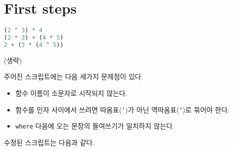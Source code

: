 \chapter{\Large{First steps}}


\begin{lstlisting}[language=Haskell,escapeinside=~~]
(2 ^ 3) * 4
(2 * 3) + (4 * 5)
2 + (3 * (4 ^ 5))
\end{lstlisting}


(생략)


주어진 스크립트에는 다음 세가지 문제점이 있다.
\begin{itemize}
\item 함수 이름이 소문자로 시작되지 않는다.
\item 함수를 인자 사이에서 쓰려면 따옴표(\texttt{'})가 아닌
  역따옴표(\texttt{`})로 묶어야 한다.
\item \texttt{where} 다음에 오는 문장의 들여쓰기가 일치하지 않는다.
\end{itemize}

수정된 스크립트는 다음과 같다.








